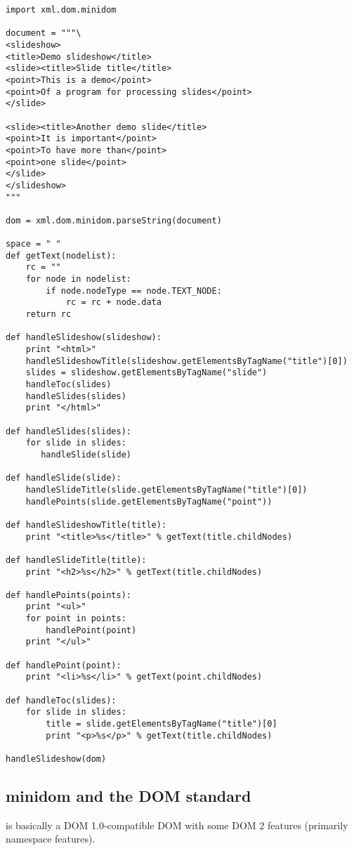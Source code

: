 \begin{verbatim}
import xml.dom.minidom

document = """\
<slideshow>
<title>Demo slideshow</title>
<slide><title>Slide title</title>
<point>This is a demo</point>
<point>Of a program for processing slides</point>
</slide>

<slide><title>Another demo slide</title>
<point>It is important</point>
<point>To have more than</point>
<point>one slide</point>
</slide>
</slideshow>
"""

dom = xml.dom.minidom.parseString(document)

space = " "
def getText(nodelist):
    rc = ""
    for node in nodelist:
        if node.nodeType == node.TEXT_NODE:
            rc = rc + node.data
    return rc

def handleSlideshow(slideshow):
    print "<html>"
    handleSlideshowTitle(slideshow.getElementsByTagName("title")[0])
    slides = slideshow.getElementsByTagName("slide")
    handleToc(slides)
    handleSlides(slides)
    print "</html>"

def handleSlides(slides):
    for slide in slides:
       handleSlide(slide)

def handleSlide(slide):
    handleSlideTitle(slide.getElementsByTagName("title")[0])
    handlePoints(slide.getElementsByTagName("point"))

def handleSlideshowTitle(title):
    print "<title>%s</title>" % getText(title.childNodes)

def handleSlideTitle(title):
    print "<h2>%s</h2>" % getText(title.childNodes)

def handlePoints(points):
    print "<ul>"
    for point in points:
        handlePoint(point)
    print "</ul>"

def handlePoint(point):
    print "<li>%s</li>" % getText(point.childNodes)

def handleToc(slides):
    for slide in slides:
        title = slide.getElementsByTagName("title")[0]
        print "<p>%s</p>" % getText(title.childNodes)

handleSlideshow(dom)
\end{verbatim}


\subsection{minidom and the DOM standard \label{minidom-and-dom}}

 is basically a DOM 1.0-compatible DOM with
some DOM 2 features (primarily namespace features). 

